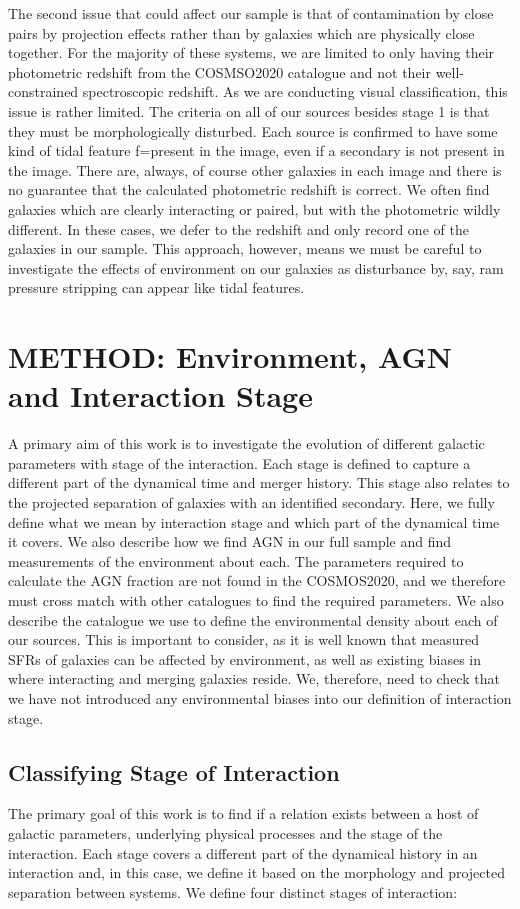 \documentclass[fleqn,usenatbib]{mnras}
\begin{document}
The second issue that could affect our sample is that of contamination by close pairs by projection effects rather than by galaxies which are physically close together. For the majority of these systems, we are limited to only having their photometric redshift from the COSMSO2020 catalogue and not their well-constrained spectroscopic redshift. As we are conducting visual classification, this issue is rather limited. The criteria on all of our sources besides stage 1 is that they must be morphologically disturbed. Each source is confirmed to have some kind of tidal feature f=present in the image, even if a secondary is not present in the image. There are, always, of course other galaxies in each image and there is no guarantee that the calculated photometric redshift is correct. We often find galaxies which are clearly interacting or paired, but with the photometric wildly different. In these cases, we defer to the redshift and only record one of the galaxies in our sample. This approach, however, means we must be careful to investigate the effects of environment on our galaxies as disturbance by, say, ram pressure stripping can appear like tidal features.

\section{METHOD: Environment, AGN and Interaction Stage} \label{method}
A primary aim of this work is to investigate the evolution of different galactic parameters with stage of the interaction. Each stage is defined to capture a different part of the dynamical time and merger history. This stage also relates to the projected separation of galaxies with an identified secondary. Here, we fully define what we mean by interaction stage and which part of the dynamical time it covers. We also describe how we find AGN in our full sample and find measurements of the environment about each. The parameters required to calculate the AGN fraction are not found in the COSMOS2020, and we therefore must cross match with other catalogues to find the required parameters. We also describe the catalogue we use to define the environmental density about each of our sources. This is important to consider, as it is well known that measured SFRs of galaxies can be affected by environment, as well as existing biases in where interacting and merging galaxies reside. We, therefore, need to check that we have not introduced any environmental biases into our definition of interaction stage. 

\subsection{Classifying Stage of Interaction}\label{sec:staging}
The primary goal of this work is to find if a relation exists between a host of galactic parameters, underlying physical processes and the stage of the interaction. Each stage covers a different part of the dynamical history in an interaction and, in this case, we define it based on the morphology and projected separation between systems. We define four distinct stages of interaction:
\end{document}

